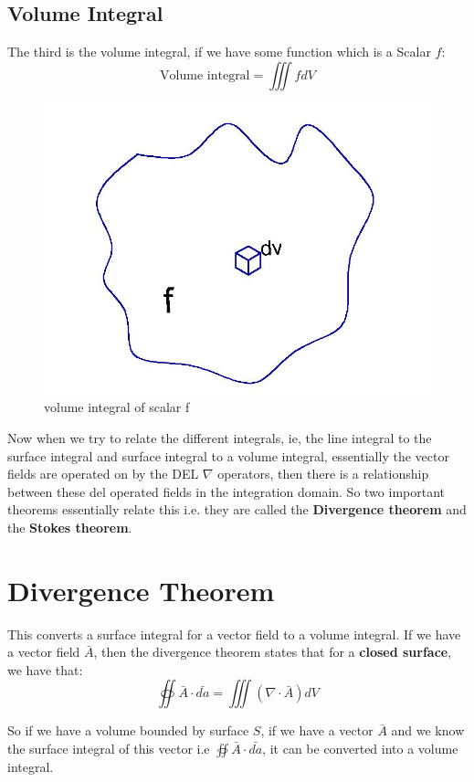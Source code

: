 \subsection{Volume Integral}
The third is the volume integral, if we have some function which is a Scalar $f$:
\begin{dmath*}
\text{Volume integral} = \iiint fdV
\end{dmath*}

\begin{figure}
\centering
\includegraphics[width=0.7\linewidth]{./graphics/fig175}
\caption{volume integral of scalar f}
\label{fig:page-8}
\end{figure}

Now when we try to relate the different integrals, ie, the line integral to the surface integral and surface integral to a volume integral, essentially the vector fields are operated on by the DEL $\nabla$ operators, then there is a relationship between these del operated fields in the integration domain. So two important theorems essentially relate this i.e. they are called the \textbf{Divergence theorem} and the \textbf{Stokes theorem}.

\section{Divergence Theorem}
This converts a surface integral for a vector field to a volume integral. If we have a vector field $\bar{A}$, then the divergence theorem states that for a \textbf{closed surface}, we have that:
\begin{equation}
\oiint \bar{A} \cdot \bar{da} = \iiint (\nabla \cdot \bar{A})dV
\end{equation}


So if we have a volume bounded by surface $S$, if we have a vector $\bar{A}$ and we know the surface integral of this vector i.e $\oiint \bar{A}\cdot\bar{da}$, it can be converted into a volume integral.


